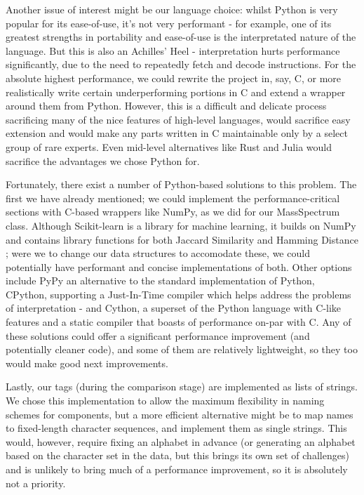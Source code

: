 \documentclass{l4proj}
\newcommand{\cit}[1]{\citep{#1}}
\begin{document}
Another issue of interest might be our language choice: whilst Python is very popular for its ease-of-use, it's not very performant - for example, one of its greatest strengths in portability and ease-of-use is the interpretated nature of the language. But this is also an Achilles' Heel - interpretation hurts performance significantly, due to the need to repeatedly fetch and decode instructions. For the absolute highest performance, we could rewrite the project in, say, C, or more realistically write certain underperforming portions in C and extend a wrapper around them from Python. However, this is a difficult and delicate process sacrificing many of the nice features of high-level languages, would sacrifice easy extension and would make any parts written in C maintainable only by a select group of rare experts. Even mid-level alternatives like Rust \cit{rustlang} and Julia would sacrifice the advantages we chose Python for. 

Fortunately, there exist a number of Python-based solutions to this problem. The first we have already mentioned; we could implement the performance-critical sections with C-based wrappers like NumPy, as we did for our MassSpectrum class. Although Scikit-learn \cit{sklearn} is a library for machine learning, it builds on NumPy and contains library functions for both Jaccard Similarity \cit{skjaccard} and Hamming Distance \cit{skhamming}; were we to change our data structures to accomodate these, we could potentially have performant and concise implementations of both. Other options include PyPy \cit{pypy} an alternative to the standard implementation of Python, CPython, supporting a Just-In-Time compiler which helps address the problems of interpretation - and Cython, a superset of the Python language with C-like features and a static compiler that boasts of performance on-par with C. Any of these solutions could offer a significant performance improvement (and potentially cleaner code), and some of them are relatively lightweight, so they too would make good next improvements.

Lastly, our tags (during the comparison stage) are implemented as lists of strings. We chose this implementation to allow the maximum flexibility in naming schemes for components, but a more efficient alternative might be to map names to fixed-length character sequences, and implement them as single strings. This would, however, require fixing an alphabet in advance (or generating an alphabet based on the character set in the data, but this brings its own set of challenges) and is unlikely to bring much of a performance improvement, so it is absolutely not a priority.
\end{document}

